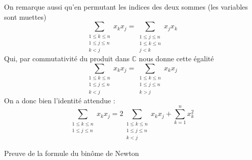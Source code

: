 \documentclass{article}
\begin{document}
\begin{question_kholle}
    On remarque aussi qu'en permutant les indices des deux sommes (les variables sont muettes)
    $$
    \sum_{\substack{1\leqslant k \leqslant n\\ 1 \leqslant j \leqslant n \\ k<j}} x_{k}x_{j} = \sum_{\substack{1\leqslant j \leqslant n\\ 1 \leqslant k \leqslant n\\j<k}} x_{j}x_{k}
    $$
    Qui, par commutativité du produit dans $\mathbb{C}$ nous donne cette égalité
    $$
    \sum_{\substack{1\leqslant k \leqslant n\\ 1 \leqslant j \leqslant n \\ k<j}} x_{k}x_{j} =
    \sum_{\substack{1\leqslant k \leqslant n\\ 1 \leqslant j \leqslant n\\k>j}} x_{k}x_{j}
    $$
    On a donc bien l'identité attendue :
    $$
    \sum_{\substack{1\leqslant k \leqslant n\\ 1 \leqslant j \leqslant n}} x_{k}x_{j} = 2 \sum_{\substack{1\leqslant k \leqslant n\\ 1 \leqslant j \leqslant n \\ k<j}} x_{k}x_{j} +
    \sum_{k=1}^{n}x_{k}^{2}
    $$
\end{question_kholle}

\begin{question_kholle}{Preuve de la formule du binôme de Newton}
    
\end{question_kholle}
\end{document}
